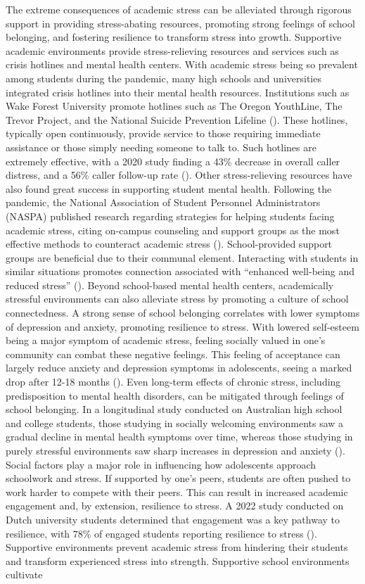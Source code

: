 \documentclass[12pt, a4paper, twoside]{article}
\begin{document}
The extreme consequences of academic stress can be alleviated through rigorous support in providing stress-abating resources, promoting strong feelings of school belonging, and fostering resilience to transform stress into growth. Supportive academic environments provide stress-relieving resources and services such as crisis hotlines and mental health centers. With academic stress being so prevalent among students during the pandemic, many high schools and universities integrated crisis hotlines into their mental health resources. 
Institutions such as Wake Forest University promote hotlines such as The Oregon YouthLine, The Trevor Project, and the National Suicide Prevention Lifeline (\cite{wfu2025}). These hotlines, typically open continuously, provide service to those requiring immediate assistance or those simply needing someone to talk to. Such hotlines are extremely effective, with a 2020 study finding a 43\% decrease in overall caller distress, and a 56\% caller follow-up rate (\cite{boness2021}). Other stress-relieving resources have also found great success in supporting student mental health. Following the pandemic, the National Association of Student Personnel Administrators (NASPA) published research regarding strategies for helping students facing academic stress, citing on-campus counseling and support groups as the most effective methods to counteract academic stress (\cite{wfu2025}). School-provided support groups are beneficial due to their communal element. Interacting with students in similar situations promotes connection associated with “enhanced well-being and reduced stress” (\cite{duan2016}). Beyond school-based mental health centers, academically stressful environments can also alleviate stress by promoting a culture of school connectedness. A strong sense of school belonging correlates with lower symptoms of depression and anxiety, promoting resilience to stress. With lowered self-esteem being a major symptom of academic stress, feeling socially valued in one’s community can combat these negative feelings. This feeling of acceptance can largely reduce anxiety and depression symptoms in adolescents, seeing a marked drop after 12-18 months (\cite{allen2024}). Even long-term effects of chronic stress, including predisposition to mental health disorders, can be mitigated through feelings of school belonging. In a longitudinal study conducted on Australian high school and college students, those studying in socially welcoming environments saw a gradual decline in mental health symptoms over time, whereas those studying in purely stressful environments saw sharp increases in depression and anxiety (\cite{allen2024}). Social factors play a major role in influencing how adolescents approach schoolwork and stress. If supported by one’s peers, students are often pushed to work harder to compete with their peers. This can result in increased academic engagement and, by extension, resilience to stress. A 2022 study conducted on Dutch university students determined that engagement was a key pathway to resilience, with 78\% of engaged students reporting resilience to stress (\cite{versteeg2022}). Supportive environments prevent academic stress from hindering their students and transform experienced stress into strength. Supportive school environments cultivate 
\end{document}
